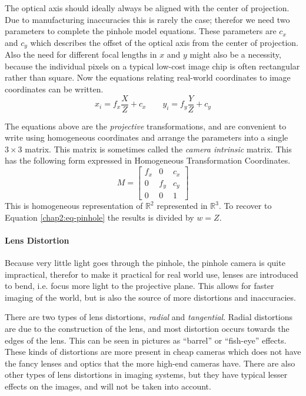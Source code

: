 The optical axis should ideally always be aligned with the center of projection. Due to
manufacturing inaccuracies this is rarely the case; therefor we need two parameters
to complete the pinhole model equations. These parameters are $c_x$ and $c_y$ which
describes the offset of the optical axis from the center of projection. Also the need for
different focal lengths in $x$ and $y$ might also be a necessity, because the individual
pixels on a typical low-cost image chip is often rectangular rather than square. Now the
equations relating real-world coordinates to image coordinates can be written.
\cite{openCV}
\begin{equation}
    \label{chap2:eq-pinhole}
    x_i = f_x \frac{X}{Z} + c_x \quad \quad y_i = f_y \frac{Y}{Z} + c_y
\end{equation}

The equations above are the \emph{projective} transformations, and are convenient to
write using homogeneous coordinates and arrange the parameters into a single $3\times 3$
matrix. This matrix is sometimes called the \emph{camera intrinsic} matrix. This has the
following form expressed in Homogeneous Transformation Coordinates. 
\begin{equation}
    M = \left[ \begin{matrix}
                f_x & 0 & c_x \\
                0 & f_y & c_y \\
                0 & 0 & 1 
                \end{matrix} \right]
\end{equation}
This is homogeneous representation of $\mathbb{R}^2$ represented in $\mathbb{R}^3$. To
recover to Equation \eqref{chap2:eq-pinhole} the results is divided by $w = Z$.

\paragraph{Lens Distortion}
\label{chap2:sec-distortion}
Because very little light goes through the pinhole, the pinhole camera is quite
impractical, therefor to make it practical for
real world use, lenses are introduced to bend, i.e. focus more light to the projective plane.
This allows for faster imaging of the world, but is also the source of more distortions
and inaccuracies. 

There are two types of lens distortions, \emph{radial} and \emph{tangential}. Radial
distortions are due to the construction of the lens, and most distortion occurs towards the edges of
the lens. This can be seen in pictures as ``barrel'' or ``fish-eye'' effects. 
These kinds of distortions are more present in cheap cameras which does not have the fancy lenses and optics
that the more high-end cameras have. There are also other types of lens distortions in imaging
systems, but they have typical lesser effects on the images, and will not be taken into
account. 

